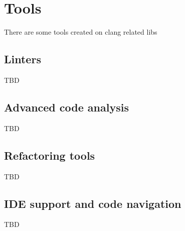 \chapter{Tools}
There are some tools created on clang related libs

\section{Linters}
TBD

\section{Advanced code analysis}
TBD

\section{Refactoring tools}
TBD

\section{IDE support and code navigation}
TBD
